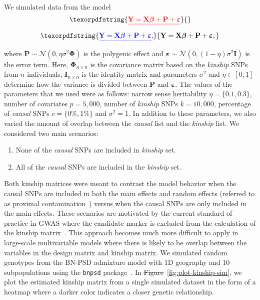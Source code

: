 \documentclass[10pt,letterpaper]{article}
\newcommand{\bX}{\textbf{X}}
\newcommand{\bY}{\textbf{Y}}
\newcommand{\bI}{\textbf{I}}
\newcommand{\be}{\boldsymbol{\varepsilon}}
\newcommand{\bbeta}{\boldsymbol{\beta}}
\newcommand{\bPhi}{\boldsymbol{\Phi}}
\providecommand{\DIFaddtex}[1]{{\protect\color{blue}\uwave{#1}}} %
\providecommand{\DIFdeltex}[1]{{\protect\color{red}\sout{#1}}}                      %
\providecommand{\DIFaddbegin}{} %
\providecommand{\DIFaddend}{} %
\providecommand{\DIFdelbegin}{} %
\providecommand{\DIFdelend}{} %
\providecommand{\DIFadd}[1]{\texorpdfstring{\DIFaddtex{#1}}{#1}} %
\providecommand{\DIFdel}[1]{\texorpdfstring{\DIFdeltex{#1}}{}} %
\newcommand{\DIFscaledelfig}{0.5}
\newlength{\DIFdelgraphicswidth} %
\newlength{\DIFdelgraphicsheight} %
\newcommand{\DIFaddincludegraphics}[2][]{{\color{blue}\fbox{\DIFOincludegraphics[#1]{#2}}}} %
\newcommand{\DIFdelincludegraphics}[2][]{%
\sbox{\DIFdelgraphicsbox}{\DIFOincludegraphics[#1]{#2}}%
\settoboxwidth{\DIFdelgraphicswidth}{\DIFdelgraphicsbox} %
\settoboxtotalheight{\DIFdelgraphicsheight}{\DIFdelgraphicsbox} %
\scalebox{\DIFscaledelfig}{%
\parbox[b]{\DIFdelgraphicswidth}{\usebox{\DIFdelgraphicsbox}\\[-\baselineskip] \rule{\DIFdelgraphicswidth}{0em}}\llap{\resizebox{\DIFdelgraphicswidth}{\DIFdelgraphicsheight}{%
\setlength{\unitlength}{\DIFdelgraphicswidth}%
\begin{picture}(1,1)%
\thicklines\linethickness{2pt} %
{\color[rgb]{1,0,0}\put(0,0){\framebox(1,1){}}}%
{\color[rgb]{1,0,0}\put(0,0){\line( 1,1){1}}}%
{\color[rgb]{1,0,0}\put(0,1){\line(1,-1){1}}}%
\end{picture}%
}\hspace*{3pt}}} %
} %
\DeclareRobustCommand{\DIFaddbegin}{\DIFOaddbegin \let\includegraphics\DIFaddincludegraphics} %
\DeclareRobustCommand{\DIFaddend}{\DIFOaddend \let\includegraphics\DIFOincludegraphics} %
\DeclareRobustCommand{\DIFdelbegin}{\DIFOdelbegin \let\includegraphics\DIFdelincludegraphics} %
\DeclareRobustCommand{\DIFdelend}{\DIFOaddend \let\includegraphics\DIFOincludegraphics} %
\begin{document}
We simulated data from the model
\DIFdelbegin \begin{displaymath}
\DIFdel{\bY = \bX \bbeta + \mathbf{P} + \be
}\end{displaymath}%
\DIFdelend \DIFaddbegin \begin{equation*}
\DIFadd{\bY = \bX \bbeta + \mathbf{P} + \be,
}\end{equation*}\DIFaddend 
where $\mathbf{P}\sim \mathcal{N}(0, \eta \sigma^2 \bPhi)$ is the polygenic effect and $\be \sim \mathcal{N}(0, (1-\eta) \sigma^2 \bI)$ is the error term. Here, $\bPhi_{n \times n}$ is the covariance matrix based on the \textit{kinship} SNPs from $n$ individuals, $\bI_{n \times n}$ is the identity matrix and parameters $\sigma^2$ and $\eta \in [0,1]$ determine how the variance is divided between $\mathbf{P}$ and $\be$. The values of the parameters that we used were as follows: narrow sense heritability $\eta=\lbrace 0.1, 0.3 \rbrace$, number of covariates $p = 5,000$, number of \textit{kinship} SNPs $k = 10,000$, percentage of \textit{causal} SNPs $c=\lbrace 0\%, 1\%\rbrace$ and $\sigma^2 = 1$. In addition to these parameters, we also varied the amount of overlap between the \textit{causal} list and the \textit{kinship} list. We considered two main scenarios:

\begin{enumerate}
	\item None of the \textit{causal} SNPs are included in \textit{kinship} set.
	\item All of the \textit{causal} SNPs are included in the \textit{kinship} set.
\end{enumerate}

Both kinship matrices were meant to contrast the model behavior when the causal SNPs are included in both the main effects and random effects (referred to as proximal contamination~\cite{lippert2011fast}) versus when the causal SNPs are only included in the main effects. These scenarios are motivated by the current standard of practice in GWAS where the candidate marker is excluded from the calculation of the kinship matrix~\cite{lippert2011fast}. This approach becomes much more difficult to apply in large-scale multivariable models where there is likely to be overlap between the variables in the design matrix and kinship matrix. We simulated random genotypes from the BN-PSD admixture model with 1D geography and 10 subpopulations using the \texttt{bnpsd} package~\cite{bnpsd1,bnpsd2}. In \DIFdelbegin \DIFdel{Figure}\DIFdelend \DIFaddbegin \DIFadd{Fig}\DIFaddend ~\ref{fig:plot-kinship-sim}, we plot the estimated kinship matrix from a single simulated dataset in the form of a heatmap where a darker color indicates a closer genetic relationship. 
\end{document}
